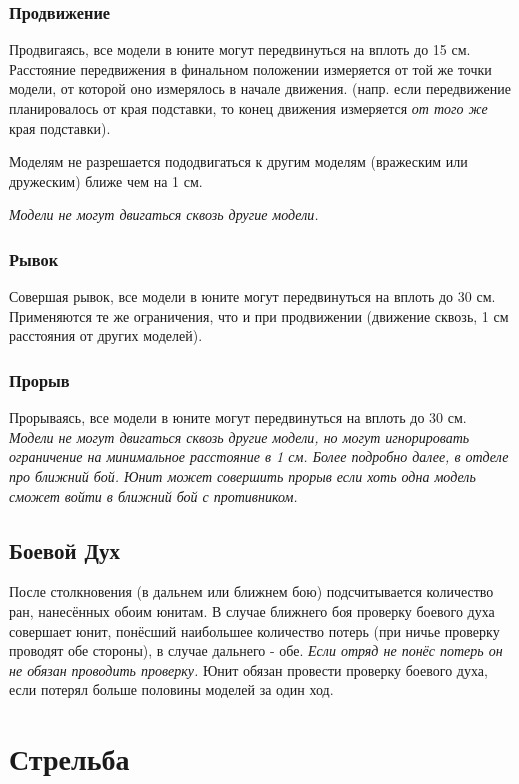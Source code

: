 \documentclass[twocolumn]{article}
\begin{document}
\subsubsection{Продвижение}
Продвигаясь, все модели в юните могут передвинуться на вплоть до 15 см. Расстояние передвижения в финальном положении измеряется от той же точки модели, от которой оно измерялось в начале движения. (напр. если передвижение планировалось от края подставки, то конец движения измеряется \emph{от того же} края подставки).

Моделям не разрешается пододвигаться к другим моделям (вражеским или дружеским) ближе чем на 1 см.

\emph{Модели не могут двигаться сквозь другие модели.}

\subsubsection{Рывок}
Совершая рывок, все модели в юните могут передвинуться на вплоть до 30 см. Применяются те же ограничения, что и при продвижении (движение сквозь, 1 см расстояния от других моделей).

\subsubsection{Прорыв}
Прорываясь, все модели в юните могут передвинуться на вплоть до 30 см. \emph{Модели не могут двигаться сквозь другие модели, но могут игнорировать ограничение на минимальное расстояние в 1 см. Более подробно далее, в отделе про ближний бой. Юнит может совершить прорыв если хоть одна модель сможет войти в ближний бой с противником.}

\subsection{Боевой Дух}
После столкновения (в дальнем или ближнем бою) подсчитывается количество ран, нанесённых обоим юнитам. В случае ближнего боя проверку боевого духа совершает юнит, понёсший наибольшее количество потерь (при ничье проверку проводят обе стороны), в случае дальнего - обе. \emph{Если отряд не понёс потерь он не обязан проводить проверку.} Юнит обязан провести проверку боевого духа, если потерял больше половины моделей за один ход.

\newpage

\section{Стрельба}
\end{document}
